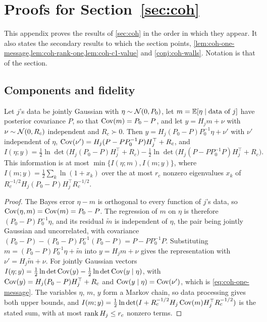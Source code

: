 \section{Proofs for \texorpdfstring{Section~\ref{sec:coh}}{coherence}}\label{app:coh}

This appendix proves the results of \cref{sec:coh} in the order in which they appear. It also states the secondary results to which the section points, \cref{lem:coh-one-message,lem:coh-rank-one,lem:coh-c1-value} and \cref{conj:coh-walls}. Notation is that of the section.

\subsection{Components and fidelity}\label{app:coh-fidelity}

\begin{lemma}\label{lem:coh-one-message}
Let $j$'s data be jointly Gaussian with $\eta\sim\mathcal{N}(0,P_0)$, let $m=\mathbb{E}[\eta\mid\text{data of }j]$ have posterior covariance $P$, so that $\operatorname{Cov}(m)=P_0-P$, and let $y=H_jm+\nu$ with $\nu\sim\mathcal{N}(0,R_c)$ independent and $R_c\succ0$. Then $y=H_j(P_0-P)P_0^{-1}\eta+\nu'$ with $\nu'$ independent of $\eta$, $\operatorname{Cov}(\nu')=H_j(P-PP_0^{-1}P)H_j^\top+R_c$, and
\begin{equation}\label{eq:coh-one-message}
I(\eta;y)=\tfrac12\ln\det\bigl(H_j(P_0-P)H_j^\top+R_c\bigr)-\tfrac12\ln\det\bigl(H_j(P-PP_0^{-1}P)H_j^\top+R_c\bigr).
\end{equation}
This information is at most $\min\{I(\eta;m),I(m;y)\}$, where $I(m;y)=\frac12\sum_k\ln(1+x_k)$ over the at most $r_c$ nonzero eigenvalues $x_k$ of $R_c^{-1/2}H_j(P_0-P)H_j^\top R_c^{-1/2}$.
\end{lemma}

\begin{proof}
The Bayes error $\eta-m$ is orthogonal to every function of $j$'s data, so $\operatorname{Cov}(\eta,m)=\operatorname{Cov}(m)=P_0-P$. The regression of $m$ on $\eta$ is therefore $(P_0-P)P_0^{-1}\eta$, and its residual $\tilde m$ is independent of $\eta$, the pair being jointly Gaussian and uncorrelated, with covariance $(P_0-P)-(P_0-P)P_0^{-1}(P_0-P)=P-PP_0^{-1}P$. Substituting $m=(P_0-P)P_0^{-1}\eta+\tilde m$ into $y=H_jm+\nu$ gives the representation with $\nu'=H_j\tilde m+\nu$. For jointly Gaussian vectors $I(\eta;y)=\frac12\ln\det\operatorname{Cov}(y)-\frac12\ln\det\operatorname{Cov}(y\mid\eta)$, with $\operatorname{Cov}(y)=H_j(P_0-P)H_j^\top+R_c$ and $\operatorname{Cov}(y\mid\eta)=\operatorname{Cov}(\nu')$, which is \eqref{eq:coh-one-message}. The variables $\eta$, $m$, $y$ form a Markov chain, so data processing gives both upper bounds, and $I(m;y)=\frac12\ln\det(I+R_c^{-1/2}H_j\operatorname{Cov}(m)H_j^\top R_c^{-1/2})$ is the stated sum, with at most $\operatorname{rank} H_j\le r_c$ nonzero terms.
\end{proof}

